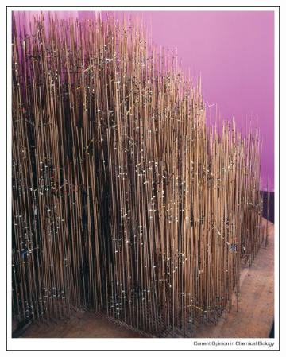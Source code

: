\begin{figure}
\begin{subfigure}{.5\textwidth}
  {\includegraphics[width=0.9\linewidth]{./figures/ch1/kendrew_myoglobin_forest_of_rods}}    
  \caption{}
  \label{Fig:kendrew_myoglobin_forest_of_rods}
  \hspace{0.2cm}
  \end{subfigure}%
  \begin{subfigure}{.5\textwidth}
  \centering

\end{subfigure}
\end{figure}

